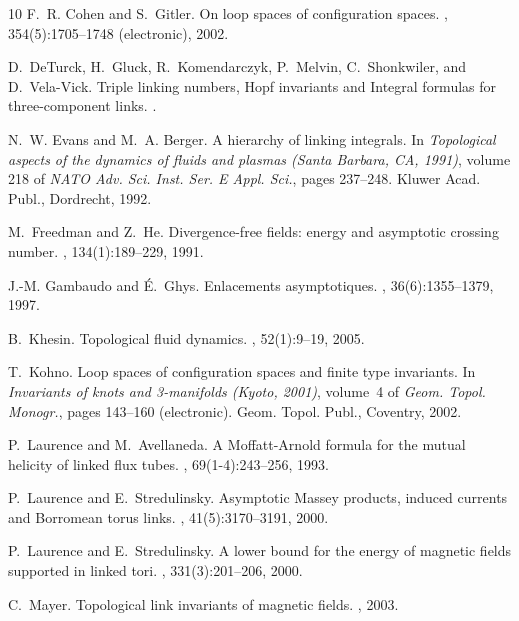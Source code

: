 \documentclass[12pt]{article}
\begin{document}
\begin{thebibliography}{10}
F.~R. Cohen and S.~Gitler.
\newblock On loop spaces of configuration spaces.
, 354(5):1705--1748 (electronic), 2002.

D.~DeTurck, H.~Gluck, R.~Komendarczyk, P.~Melvin, C.~Shonkwiler, and
  D.~Vela-Vick.
\newblock Triple linking numbers, {H}opf invariants and {I}ntegral formulas for
  three-component links.
.

N.~W. Evans and M.~A. Berger.
\newblock A hierarchy of linking integrals.
\newblock In {\em Topological aspects of the dynamics of fluids and plasmas
  (Santa Barbara, CA, 1991)}, volume 218 of {\em NATO Adv. Sci. Inst. Ser. E
  Appl. Sci.}, pages 237--248. Kluwer Acad. Publ., Dordrecht, 1992.

M.~Freedman and Z.~He.
\newblock Divergence-free fields: energy and asymptotic crossing number.
, 134(1):189--229, 1991.

J.-M. Gambaudo and {\'E}.~Ghys.
\newblock Enlacements asymptotiques.
, 36(6):1355--1379, 1997.

B.~Khesin.
\newblock Topological fluid dynamics.
, 52(1):9--19, 2005.

T.~Kohno.
\newblock Loop spaces of configuration spaces and finite type invariants.
\newblock In {\em Invariants of knots and 3-manifolds (Kyoto, 2001)}, volume~4
  of {\em Geom. Topol. Monogr.}, pages 143--160 (electronic). Geom. Topol.
  Publ., Coventry, 2002.

P.~Laurence and M.~Avellaneda.
\newblock A {M}offatt-{A}rnold formula for the mutual helicity of linked flux
  tubes.
, 69(1-4):243--256, 1993.

P.~Laurence and E.~Stredulinsky.
\newblock Asymptotic {M}assey products, induced currents and {B}orromean torus
  links.
, 41(5):3170--3191, 2000.

P.~Laurence and E.~Stredulinsky.
\newblock A lower bound for the energy of magnetic fields supported in linked
  tori.
, 331(3):201--206, 2000.

C.~Mayer.
\newblock Topological link invariants of magnetic fields.
, 2003.


\end{thebibliography}
\end{document}
